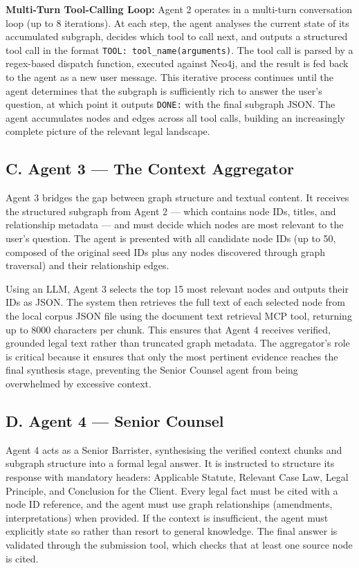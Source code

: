 \documentclass[10pt, a4paper, twocolumn]{article}
\begin{document}
\textbf{Multi-Turn Tool-Calling Loop:} Agent 2 operates in a multi-turn conversation loop (up to 8 iterations). At each step, the agent analyses the current state of its accumulated subgraph, decides which tool to call next, and outputs a structured tool call in the format \texttt{TOOL: tool\_name(arguments)}. The tool call is parsed by a regex-based dispatch function, executed against Neo4j, and the result is fed back to the agent as a new user message. This iterative process continues until the agent determines that the subgraph is sufficiently rich to answer the user's question, at which point it outputs \texttt{DONE:} with the final subgraph JSON. The agent accumulates nodes and edges across all tool calls, building an increasingly complete picture of the relevant legal landscape.

\subsection{C. Agent 3 — The Context Aggregator}
Agent 3 bridges the gap between graph structure and textual content. It receives the structured subgraph from Agent 2 — which contains node IDs, titles, and relationship metadata — and must decide which nodes are most relevant to the user's question. The agent is presented with all candidate node IDs (up to 50, composed of the original seed IDs plus any nodes discovered through graph traversal) and their relationship edges.

Using an LLM, Agent 3 selects the top 15 most relevant nodes and outputs their IDs as JSON. The system then retrieves the full text of each selected node from the local corpus JSON file using the document text retrieval MCP tool, returning up to 8000 characters per chunk. This ensures that Agent 4 receives verified, grounded legal text rather than truncated graph metadata. The aggregator's role is critical because it ensures that only the most pertinent evidence reaches the final synthesis stage, preventing the Senior Counsel agent from being overwhelmed by excessive context.

\subsection{D. Agent 4 — Senior Counsel}
Agent 4 acts as a Senior Barrister, synthesising the verified context chunks and subgraph structure into a formal legal answer. It is instructed to structure its response with mandatory headers: Applicable Statute, Relevant Case Law, Legal Principle, and Conclusion for the Client. Every legal fact must be cited with a node ID reference, and the agent must use graph relationships (amendments, interpretations) when provided. If the context is insufficient, the agent must explicitly state so rather than resort to general knowledge. The final answer is validated through the submission tool, which checks that at least one source node is cited.
\end{document}
